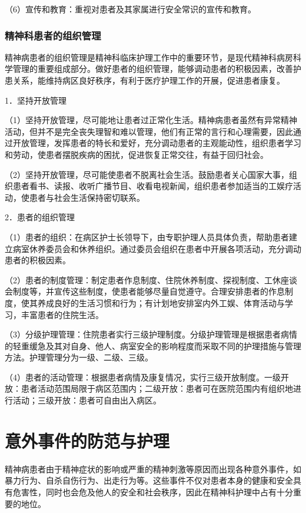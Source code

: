 （6）宣传和教育：重视对患者及其家属进行安全常识的宣传和教育。

\subsubsection{精神科患者的组织管理}

精神病患者的组织管理是精神科临床护理工作中的重要环节，是现代精神科病房科学管理的重要组成部分。做好患者的组织管理，能够调动患者的积极因素，改善护患关系，能维持病区良好秩序，有利于医疗护理工作的开展，促进患者康复。

1．坚持开放管理

（1）坚持开放管理，尽可能地让患者过正常化生活。精神病患者虽然有异常精神活动，但并不是完全丧失理智和难以管理，他们有正常的言行和心理需要，因此通过开放管理，发挥患者的特长和爱好，充分调动患者的主观能动性，组织患者学习和劳动，使患者摆脱疾病的困扰，促进恢复正常交往，有益于回归社会。

（2）坚持开放管理，尽可能使患者不脱离社会生活。鼓励患者关心国家大事，组织患者看书、读报、收听广播节目、收看电视新闻，组织患者参加适当的工娱疗活动，使患者与社会生活保持密切联系。

2．患者的组织管理

（1）患者的组织：在病区护士长领导下，由专职护理人员具体负责，帮助患者建立病室休养委员会和休养组织。通过委员会组织在患者中开展各项活动，充分调动患者的积极因素。

（2）患者的制度管理：制定患者作息制度、住院休养制度、探视制度、工休座谈会制度等，并宣传这些制度，使患者能够尽量自觉遵守。合理安排患者的作息制度，使其养成良好的生活习惯和行为；有计划地安排室内外工娱、体育活动与学习，丰富患者的住院生活。

（3）分级护理管理：住院患者实行三级护理制度。分级护理管理是根据患者病情的轻重缓急及其对自身、他人、病室安全的影响程度而采取不同的护理措施与管理方法。护理管理分为一级、二级、三级。

（4）患者的活动管理：根据患者病情及康复情况，实行三级开放制度。一级开放：患者活动范围局限于病区范围内；二级开放：患者可在医院范围内有组织地进行活动；三级开放：患者可自由出入病区。

\section{意外事件的防范与护理}

精神病患者由于精神症状的影响或严重的精神刺激等原因而出现各种意外事件，如暴力行为、自杀自伤行为、出走行为等。这些事件不仅对患者本身的健康和安全具有危害性，同时也会危及他人的安全和社会秩序，因此在精神科护理中占有十分重要的地位。

